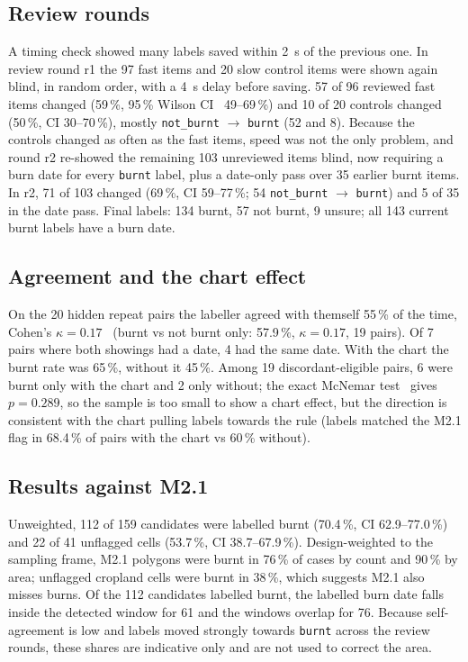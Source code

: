 \documentclass[conference]{IEEEtran}
\begin{document}
\subsection{Review rounds}
A timing check showed many labels saved within 2~s of the previous one. In review round r1 the 97
fast items and 20 slow control items were shown again blind, in random order, with a 4~s delay
before saving. 57 of 96 reviewed fast items changed (59\,\%, 95\,\% Wilson CI~\cite{wilson1927}
49--69\,\%) and 10 of 20 controls changed (50\,\%, CI 30--70\,\%), mostly \texttt{not\_burnt}
$\rightarrow$ \texttt{burnt} (52 and 8). Because the controls changed as often as the fast items,
speed was not the only problem, and round r2 re-showed the remaining 103 unreviewed items blind,
now requiring a burn date for every \texttt{burnt} label, plus a date-only pass over 35 earlier
burnt items. In r2, 71 of 103 changed (69\,\%, CI 59--77\,\%; 54 \texttt{not\_burnt}
$\rightarrow$ \texttt{burnt}) and 5 of 35 in the date pass. Final labels: 134 burnt, 57 not burnt,
9 unsure; all 143 current burnt labels have a burn date.

\subsection{Agreement and the chart effect}
On the 20 hidden repeat pairs the labeller agreed with themself 55\,\% of the time, Cohen's
$\kappa=0.17$~\cite{cohen1960} (burnt vs not burnt only: 57.9\,\%, $\kappa=0.17$, 19 pairs). Of 7
pairs where both showings had a date, 4 had the same date. With the chart the burnt rate was
65\,\%, without it 45\,\%. Among 19 discordant-eligible pairs, 6 were burnt only with the chart and
2 only without; the exact McNemar test~\cite{mcnemar1947} gives $p=0.289$, so the sample is too
small to show a chart effect, but the direction is consistent with the chart pulling labels towards
the rule (labels matched the M2.1 flag in 68.4\,\% of pairs with the chart vs 60\,\% without).

\subsection{Results against M2.1}
Unweighted, 112 of 159 candidates were labelled burnt (70.4\,\%, CI 62.9--77.0\,\%) and 22 of 41
unflagged cells (53.7\,\%, CI 38.7--67.9\,\%). Design-weighted to the sampling frame, M2.1 polygons
were burnt in 76\,\% of cases by count and 90\,\% by area; unflagged cropland cells were burnt in
38\,\%, which suggests M2.1 also misses burns. Of the 112 candidates labelled burnt, the labelled
burn date falls inside the detected window for 61 and the windows overlap for 76.
Because self-agreement is low and labels moved strongly towards \texttt{burnt} across the review
rounds, these shares are indicative only and are not used to correct the area.
\end{document}
